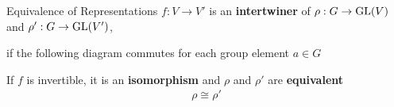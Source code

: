 
\begin{frame}{Equivalence of Representations}
    \large
    $f: V \to V'$ is an \textbf{intertwiner} of $\rho: G \to \operatorname{GL}(V)$ and $\rho': G \to \operatorname{GL}(V')$,
    
    if the following diagram commutes for each group element $a \in G$
    
    \pause
    \begin{figure}[h]
        \centering
    \end{figure}
    
    \vspace*{1em}
    \pause
    If $f$ is invertible, it is an \textbf{isomorphism} and $\rho$ and $\rho'$ are \textbf{equivalent}
    \begin{align*}
        \rho \cong \rho'
    \end{align*}
    
    \normalsize
    {\hspace*{\fill} \cite{fuchs2003}}
\end{frame}
